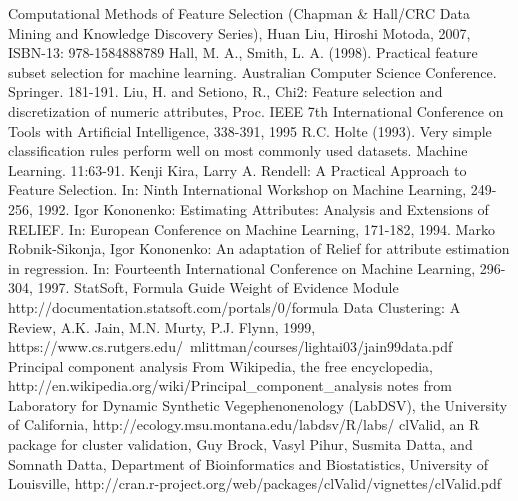 \documentclass[10pt]{article}\usepackage[]{graphicx}\usepackage[]{color}
\begin{document}
\clearpage
\begin{thebibliography}{99}
\bibitem{} Computational Methods of Feature Selection (Chapman \& Hall/CRC Data Mining and Knowledge Discovery Series), Huan Liu, Hiroshi Motoda, 2007, ISBN-13: 978-1584888789  
\bibitem{} Hall, M. A., Smith, L. A. (1998). Practical feature subset selection for machine learning. Australian Computer Science Conference. Springer. 181-191.
\bibitem{} Liu, H. and Setiono, R., Chi2: Feature selection and discretization of numeric attributes, Proc. IEEE 7th International Conference on Tools with Artificial Intelligence, 338-391, 1995
\bibitem{} R.C. Holte (1993). Very simple classification rules perform well on most commonly used datasets. Machine Learning. 11:63-91.
\bibitem{} Kenji Kira, Larry A. Rendell: A Practical Approach to Feature Selection. In: Ninth International Workshop on Machine Learning, 249-256, 1992.
\bibitem{} Igor Kononenko: Estimating Attributes: Analysis and Extensions of RELIEF. In: European Conference on Machine Learning, 171-182, 1994.
\bibitem{} Marko Robnik-Sikonja, Igor Kononenko: An adaptation of Relief for attribute estimation in regression. In: Fourteenth International Conference on Machine Learning, 296-304, 1997.
\bibitem{} StatSoft, Formula Guide Weight of Evidence Module http://documentation.statsoft.com/portals/0/formula%
\bibitem{} Data Clustering: A Review, A.K. Jain, M.N. Murty, P.J. Flynn, 1999, https://www.cs.rutgers.edu/~mlittman/courses/lightai03/jain99data.pdf
\bibitem{} Principal component analysis From Wikipedia, the free encyclopedia, http://en.wikipedia.org/wiki/Principal\_component\_analysis
\bibitem{} notes from Laboratory for Dynamic Synthetic Vegephenonenology (LabDSV),
the University of California, http://ecology.msu.montana.edu/labdsv/R/labs/
\bibitem{} clValid, an R package for cluster validation, Guy Brock, Vasyl Pihur, Susmita Datta, and Somnath Datta, Department of Bioinformatics and Biostatistics, University of Louisville, http://cran.r-project.org/web/packages/clValid/vignettes/clValid.pdf
\end{thebibliography}
\end{document}
